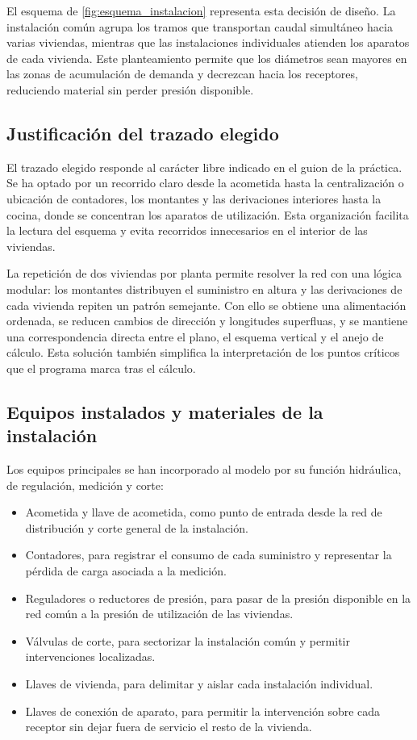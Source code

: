 \documentclass[12pt,a4paper]{article}
\begin{document}
El esquema de \cref{fig:esquema_instalacion} representa esta decisión de diseño. La instalación común agrupa los tramos que transportan caudal simultáneo hacia varias viviendas, mientras que las instalaciones individuales atienden los aparatos de cada vivienda. Este planteamiento permite que los diámetros sean mayores en las zonas de acumulación de demanda y decrezcan hacia los receptores, reduciendo material sin perder presión disponible.

\subsection{Justificación del trazado elegido}

El trazado elegido responde al carácter libre indicado en el guion de la práctica. Se ha optado por un recorrido claro desde la acometida hasta la centralización o ubicación de contadores, los montantes y las derivaciones interiores hasta la cocina, donde se concentran los aparatos de utilización. Esta organización facilita la lectura del esquema y evita recorridos innecesarios en el interior de las viviendas.

La repetición de dos viviendas por planta permite resolver la red con una lógica modular: los montantes distribuyen el suministro en altura y las derivaciones de cada vivienda repiten un patrón semejante. Con ello se obtiene una alimentación ordenada, se reducen cambios de dirección y longitudes superfluas, y se mantiene una correspondencia directa entre el plano, el esquema vertical y el anejo de cálculo. Esta solución también simplifica la interpretación de los puntos críticos que el programa marca tras el cálculo.

\subsection{Equipos instalados y materiales de la instalación}

Los equipos principales se han incorporado al modelo por su función hidráulica, de regulación, medición y corte:

\begin{itemize}
	\item Acometida y llave de acometida, como punto de entrada desde la red de distribución y corte general de la instalación.
	\item Contadores, para registrar el consumo de cada suministro y representar la pérdida de carga asociada a la medición.
	\item Reguladores o reductores de presión, para pasar de la presión disponible en la red común a la presión de utilización de las viviendas.
	\item Válvulas de corte, para sectorizar la instalación común y permitir intervenciones localizadas.
	\item Llaves de vivienda, para delimitar y aislar cada instalación individual.
	\item Llaves de conexión de aparato, para permitir la intervención sobre cada receptor sin dejar fuera de servicio el resto de la vivienda.
\end{itemize}
\end{document}
